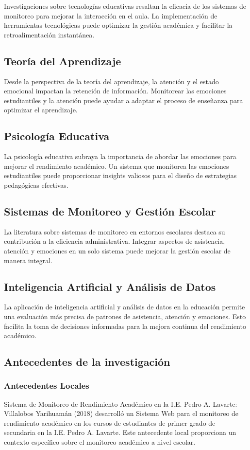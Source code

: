 \documentclass[12pt]{article}
\begin{document}
Investigaciones sobre tecnologías educativas resaltan la eficacia de los sistemas de monitoreo para mejorar la interacción en el aula. La implementación de herramientas tecnológicas puede optimizar la gestión académica y facilitar la retroalimentación instantánea.
\subsection*{Teoría del Aprendizaje}

Desde la perspectiva de la teoría del aprendizaje, la atención y el estado emocional impactan la retención de información. Monitorear las emociones estudiantiles y la atención puede ayudar a adaptar el proceso de enseñanza para optimizar el aprendizaje.
\subsection*{Psicología Educativa}

La psicología educativa subraya la importancia de abordar las emociones para mejorar el rendimiento académico. Un sistema que monitorea las emociones estudiantiles puede proporcionar insights valiosos para el diseño de estrategias pedagógicas efectivas.
\subsection*{Sistemas de Monitoreo y Gestión Escolar}

La literatura sobre sistemas de monitoreo en entornos escolares destaca su contribución a la eficiencia administrativa. Integrar aspectos de asistencia, atención y emociones en un solo sistema puede mejorar la gestión escolar de manera integral.
\subsection*{Inteligencia Artificial y Análisis de Datos}

La aplicación de inteligencia artificial y análisis de datos en la educación permite una evaluación más precisa de patrones de asistencia, atención y emociones. Esto facilita la toma de decisiones informadas para la mejora continua del rendimiento académico.
\subsection{Antecedentes de la investigación } %
\subsubsection*{Antecedentes Locales}
Sistema de Monitoreo de Rendimiento Académico en la I.E. Pedro A. Lavarte:
Villalobos Yarihuamán (2018) desarrolló un Sistema Web para el monitoreo de rendimiento académico en los cursos de estudiantes de primer grado de secundaria en la I.E. Pedro A. Lavarte. Este antecedente local proporciona un contexto específico sobre el monitoreo académico a nivel escolar.
\end{document}
